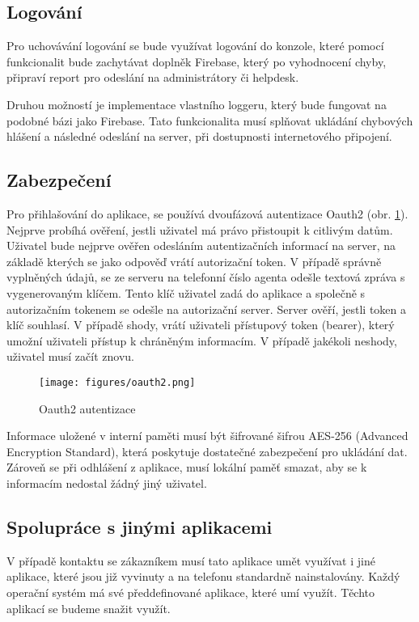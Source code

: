 \documentclass[11pt,twoside,a4paper]{book}
\begin{document}
\subsection{Logování}
Pro uchovávání logování se bude využívat logování do konzole, které pomocí funkcionalit bude zachytávat doplněk Firebase, který po vyhodnocení chyby, připraví report pro odeslání na administrátory či helpdesk. 

Druhou možností je implementace vlastního loggeru, který bude fungovat na podobné bázi jako Firebase. Tato funkcionalita musí splňovat ukládání chybových hlášení a následné odeslání na server, při dostupnosti internetového připojení.

\subsection{Zabezpečení}
Pro přihlašování do aplikace, se používá dvoufázová autentizace Oauth2 (obr. \ref{fig:oauth2}). Nejprve probíhá ověření, jestli uživatel má právo přistoupit k citlivým datům. Uživatel bude nejprve ověřen odesláním autentizačních informací na server, na základě kterých se jako odpověď vrátí autorizační token. V případě správně vyplněných údajů, se ze serveru na telefonní číslo agenta odešle textová zpráva s vygenerovaným klíčem. Tento klíč uživatel zadá do aplikace a společně s autorizačním tokenem se odešle na autorizační server. Server ověří, jestli token a klíč souhlasí. V případě shody, vrátí uživateli přístupový token (bearer), který umožní uživateli přístup k chráněným informacím. V případě jakékoli neshody, uživatel musí začít znovu.

\begin{figure}[ht]
\begin{center}
\texttt{[image: figures/oauth2.png]}
\caption{Oauth2 autentizace}
\label{fig:oauth2}
\end{center}
\end{figure}

Informace uložené v interní paměti musí být šifrované šifrou AES-256 (Advanced Encryption Standard), která poskytuje dostatečné zabezpečení pro ukládání dat. Zároveň se při odhlášení z aplikace, musí lokální paměť smazat, aby se k informacím nedostal žádný jiný uživatel. 

\subsection{Spolupráce s jinými aplikacemi}
V případě kontaktu se zákazníkem musí tato aplikace umět využívat i jiné aplikace, které jsou již vyvinuty a na telefonu standardně nainstalovány. Každý operační systém má své předdefinované aplikace, které umí využít. Těchto aplikací se budeme snažit využít.
\end{document}
